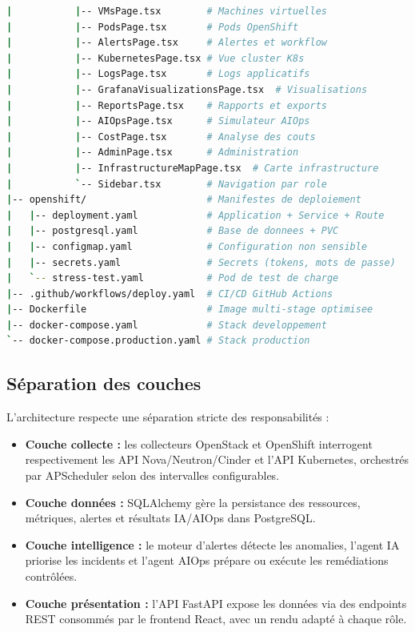 \documentclass[11pt,a4paper]{report}
\begin{document}
\begin{lstlisting}[language=bash, caption=Structure du projet Cloud AI Monitor, basicstyle=\footnotesize\ttfamily]
|           |-- VMsPage.tsx        # Machines virtuelles
|           |-- PodsPage.tsx       # Pods OpenShift
|           |-- AlertsPage.tsx     # Alertes et workflow
|           |-- KubernetesPage.tsx # Vue cluster K8s
|           |-- LogsPage.tsx       # Logs applicatifs
|           |-- GrafanaVisualizationsPage.tsx  # Visualisations
|           |-- ReportsPage.tsx    # Rapports et exports
|           |-- AIOpsPage.tsx      # Simulateur AIOps
|           |-- CostPage.tsx       # Analyse des couts
|           |-- AdminPage.tsx      # Administration
|           |-- InfrastructureMapPage.tsx  # Carte infrastructure
|           `-- Sidebar.tsx        # Navigation par role
|-- openshift/                     # Manifestes de deploiement
|   |-- deployment.yaml            # Application + Service + Route
|   |-- postgresql.yaml            # Base de donnees + PVC
|   |-- configmap.yaml             # Configuration non sensible
|   |-- secrets.yaml               # Secrets (tokens, mots de passe)
|   `-- stress-test.yaml           # Pod de test de charge
|-- .github/workflows/deploy.yaml  # CI/CD GitHub Actions
|-- Dockerfile                     # Image multi-stage optimisee
|-- docker-compose.yaml            # Stack developpement
`-- docker-compose.production.yaml # Stack production
\end{lstlisting}

\subsection{Séparation des couches}

L'architecture respecte une séparation stricte des responsabilités :

\begin{itemize}[label=\textbullet, leftmargin=1.5cm, labelsep=0.5cm,
                itemsep=0.1em, parsep=0em, topsep=0.2em]
    \item \textbf{Couche collecte :} les collecteurs OpenStack et OpenShift
    interrogent respectivement les API Nova/Neutron/Cinder et l'API
    Kubernetes, orchestrés par APScheduler selon des intervalles
    configurables.
    \item \textbf{Couche données :} SQLAlchemy gère la persistance des
    ressources, métriques, alertes et résultats IA/AIOps dans PostgreSQL.
    \item \textbf{Couche intelligence :} le moteur d'alertes détecte les
    anomalies, l'agent IA priorise les incidents et l'agent AIOps prépare ou
    exécute les remédiations contrôlées.
    \item \textbf{Couche présentation :} l'API FastAPI expose les données via
    des endpoints REST consommés par le frontend
    React, avec un rendu adapté à chaque rôle.
\end{itemize}
\end{document}
